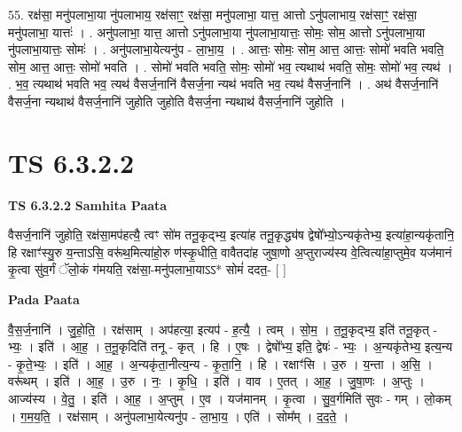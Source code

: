 \documentclass[17pt]{extarticle}
\begin{document}
55. रक्ष॑सा॒ मनु॑पलाभा॒या नु॑पलाभाय॒ रक्ष॑साꣳ॒॒ रक्ष॑सा॒ मनु॑पलाभा॒ यात्त॒ आत्तो ऽनु॑पलाभाय॒ रक्ष॑साꣳ॒॒ रक्ष॑सा॒ मनु॑पलाभा॒ यात्तः॑ । . अनु॑पलाभा॒ यात्त॒ आत्तो ऽनु॑पलाभा॒या नु॑पलाभा॒यात्तः॒ सोमः॒ सोम॒ आत्तो ऽनु॑पलाभा॒या नु॑पलाभा॒यात्तः॒ सोमः॑ । . अनु॑पलाभा॒येत्यनु॑प - ला॒भा॒य॒ । . आत्तः॒ सोमः॒ सोम॒ आत्त॒ आत्तः॒ सोमो॑ भवति भवति॒ सोम॒ आत्त॒ आत्तः॒ सोमो॑ भवति । . सोमो॑ भवति भवति॒ सोमः॒ सोमो॑ भव॒ त्यथाथ॑ भवति॒ सोमः॒ सोमो॑ भव॒ त्यथ॑ । . भ॒व॒ त्यथाथ॑ भवति भव॒ त्यथ॑ वैसर्ज॒नानि॑ वैसर्ज॒ना न्यथ॑ भवति भव॒ त्यथ॑ वैसर्ज॒नानि॑ । . अथ॑ वैसर्ज॒नानि॑ वैसर्ज॒ना न्यथाथ॑ वैसर्ज॒नानि॑ जुहोति जुहोति वैसर्ज॒ना न्यथाथ॑ वैसर्ज॒नानि॑ जुहोति । \newline
\pagebreak
{}

\section{ TS 6.3.2.2 }

\textbf{TS 6.3.2.2 } \newline
\textbf{Samhita Paata} \newline

वैसर्ज॒नानि॑ जुहोति॒ रक्ष॑सा॒मप॑हत्यै॒ त्वꣳ सो॑म तनू॒कृद्भ्य॒ इत्या॑ह तनू॒कृद्ध्य॑ष द्वेषो᳚भ्यो॒ऽन्यकृ॑तेभ्य॒ इत्या॑हा॒न्यकृ॑तानि॒ हि रक्षाꣳ॑स्यु॒रु य॒न्ताऽसि॒ वरू॑थ॒मित्या॑हो॒रु ण॑स्कृ॒धीति॒ वावैतदा॑ह जुषा॒णो अ॒प्तुराज्य॑स्य वे॒त्वित्या॑हा॒प्तुमे॒व यज॑मानं कृ॒त्वा सु॑व॒र्गं ॅलो॒कं ग॑मयति॒ रक्ष॑सा॒-मनु॑पलाभा॒याऽऽ* सोमं॑ ददत॒- [  ] \newline

\textbf{Pada Paata} \newline

वै॒स॒र्ज॒नानि॑ । जु॒हो॒ति॒ । रक्ष॑साम् । अप॑हत्या॒ इत्यप॑ - ह॒त्यै॒ । त्वम् । सो॒म॒ । त॒नू॒कृद्भ्य॒ इति॑ तनू॒कृत् - भ्यः॒ । इति॑ । आ॒ह॒ । त॒नू॒कृदिति॑ तनू - कृत् । हि । ए॒षः । द्वेषो᳚भ्य॒ इति॒ द्वेषः॑ - भ्यः॒ । अ॒न्यकृ॑तेभ्य॒ इत्य॒न्य - कृ॒ते॒भ्यः॒ । इति॑ । आ॒ह॒ । अ॒न्यकृ॑ता॒नीत्य॒न्य - कृ॒ता॒नि॒ । हि । रक्षाꣳ॑सि । उ॒रु । य॒न्ता । अ॒सि॒ । वरू॑थम् । इति॑ । आ॒ह॒ । उ॒रु । नः॒ । कृ॒धि॒ । इति॑ । वाव । ए॒तत् । आ॒ह॒ । जु॒षा॒णः । अ॒प्तुः । आज्य॑स्य । वे॒तु॒ । इति॑ । आ॒ह॒ । अ॒प्तुम् । ए॒व । यज॑मानम् । कृ॒त्वा । सु॒व॒र्गमिति॑ सुवः - गम् । लो॒कम् । ग॒म॒य॒ति॒ । रक्ष॑साम् । अनु॑पलाभा॒येत्यनु॑प - ला॒भा॒य॒ । एति॑ । सोम᳚म् । द॒द॒ते॒ ।  \newline
\end{document}
